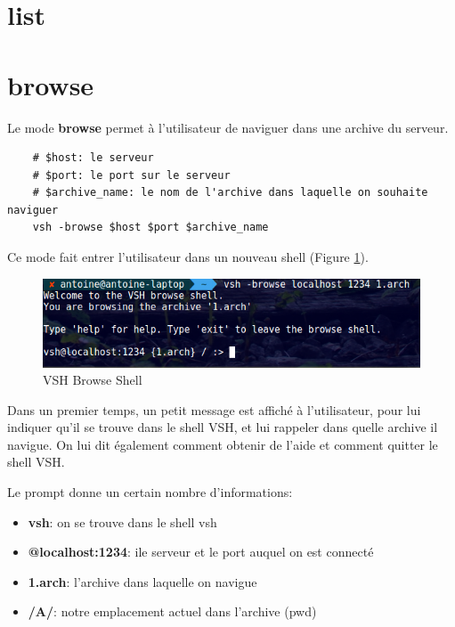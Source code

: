 \documentclass[titlepage]{article}
\begin{document}
	\section{list}

	\section{browse}

	Le mode \textbf{browse} permet à l'utilisateur de naviguer dans une archive du serveur.

	\begin{lstlisting}
	# $host: le serveur
	# $port: le port sur le serveur
	# $archive_name: le nom de l'archive dans laquelle on souhaite naviguer
	vsh -browse $host $port $archive_name
	\end{lstlisting}

	Ce mode fait entrer l'utilisateur dans un nouveau shell (Figure \ref{fig:browse}).

	\begin{figure}
  	\includegraphics[width=\linewidth]{browse.png}
  	\caption{VSH Browse Shell}
  	\label{fig:browse}
	\end{figure}

	Dans un premier temps, un petit message est affiché à l'utilisateur, pour lui indiquer qu'il se trouve dans le shell VSH, et lui rappeler dans quelle archive il navigue. On lui dit également comment obtenir de l'aide et comment quitter le shell VSH.

	Le prompt donne un certain nombre d'informations:
	\begin{itemize}  
		\item \textbf{vsh}: on se trouve dans le shell vsh
		\item \textbf{@localhost:1234}: ile serveur et le port auquel on est connecté
		\item \textbf{{1.arch}}: l'archive dans laquelle on navigue
		\item \textbf{/A/}: notre emplacement actuel dans l'archive (pwd) 
	\end{itemize}
\end{document}
